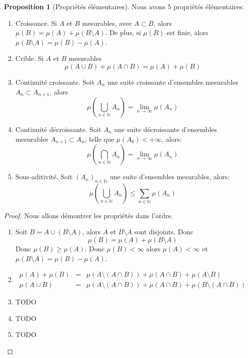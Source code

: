 \documentclass{article}
\theoremstyle{definition}
\theoremstyle{definition}
\newtheorem{prop}{Proposition}
\theoremstyle{definition}
\theoremstyle{definition}
\theoremstyle{plain}
\theoremstyle{definition}
\begin{document}
\begin{prop}[Propriétés élémentaires]\label{prop:mesure:elementaire}
	Nous avons 5 propriétés élémentaires:
	\begin{enumerate}
		\item Croissance. Si $A$ et $B$ mesurables, avec $A \subset B$, alors $\mu(B) = \mu(A) + \mu(B \setminus A)$. De plus,
		      si $\mu(B)$ est finie, alors $\mu(B\setminus A) = \mu(B) - \mu(A)$.
		\item Crible. Si $A$ et $B$ mesurables
		      \[\mu(A\cup B) + \mu(A \cap B) = \mu(A) + \mu(B)\]
		\item Continuité croissante. Soit $A_n$ une suite croissante d'ensembles mesurables $A_n \subset A_{n+1}$,
		      alors
		      \[\mu(\bigcup\limits_{n \in \mathbb{N}} A_n) = \lim\limits_{n \to \infty} \mu(A_n)\]
		\item Continuité décroissante. Soit $A_n$ une suite décroissante d'ensembles mesurables $A_{n+1}
			      \subset A_n$, telle que $\mu(A_0) < +\infty$, alors:
		      \[\mu(\bigcap\limits_{n \in \mathbb{N}} A_n) = \lim\limits_{n \to \infty} \mu(A_n)\]
		\item Sous-aditivité. Soit $(A_n)_{n \in \mathbb{N}}$ une suite d'ensembles mesurables, alors:
		      \[\mu(\bigcup\limits_{n \in \mathbb{N}} A_n) \leq \sum\limits_{n \in \mathbb{N}} \mu(A_n)\]
	\end{enumerate}
\end{prop}

\begin{proof}
	Nous allons démontrer les propriétés dans l'ordre.
	\begin{enumerate}
		\item Soit $B = A \cup (B \setminus A)$, alors $A$ et $B \setminus A$ sont disjoints. Donc
		      \[\mu(B) = \mu(A) + \mu(B \setminus A)\]
		      Donc $\mu(B) \geq \mu(A)$. Donc $\mu(B) < \infty$ alors $\mu(A)< \infty$ et $\mu(B \setminus A) = \mu(B) - \mu(A)$.
		\item \begin{eqnarray*}
			      \mu(A) + \mu (B) &=& \mu( A \setminus (A \cap B)) + \mu(A \cap B) + \mu(A \setminus B) \\
			      \mu(A\cup B)&=& \mu(A \setminus (A \cap B)) + \mu(A \cap B) + \mu(B \setminus (A \cap B))
		      \end{eqnarray*}
		\item TODO
		\item TODO
		\item TODO
	\end{enumerate}
\end{proof}
\end{document}
